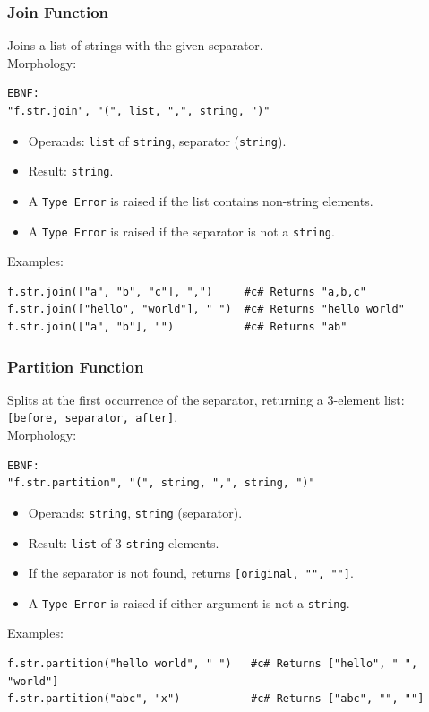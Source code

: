\subsubsection{Join Function}
Joins a list of strings with the given separator. \\
Morphology:
\begin{verbatim}
EBNF:
"f.str.join", "(", list, ",", string, ")"
\end{verbatim}
\begin{itemize}
\item Operands: \texttt{list} of \texttt{string}, separator (\texttt{string}).
\item Result: \texttt{string}.
\item A \texttt{Type Error} is raised if the list contains non-string elements.
\item A \texttt{Type Error} is raised if the separator is not a \texttt{string}.
\end{itemize}
Examples:
\begin{verbatim}
f.str.join(["a", "b", "c"], ",")     #c# Returns "a,b,c"
f.str.join(["hello", "world"], " ")  #c# Returns "hello world"
f.str.join(["a", "b"], "")           #c# Returns "ab"
\end{verbatim}

\subsubsection{Partition Function}
Splits at the first occurrence of the separator, returning a 3-element list: \texttt{[before, separator, after]}. \\
Morphology:
\begin{verbatim}
EBNF:
"f.str.partition", "(", string, ",", string, ")"
\end{verbatim}
\begin{itemize}
\item Operands: \texttt{string}, \texttt{string} (separator).
\item Result: \texttt{list} of 3 \texttt{string} elements.
\item If the separator is not found, returns \texttt{[original, "", ""]}.
\item A \texttt{Type Error} is raised if either argument is not a \texttt{string}.
\end{itemize}
Examples:
\begin{verbatim}
f.str.partition("hello world", " ")   #c# Returns ["hello", " ", "world"]
f.str.partition("abc", "x")           #c# Returns ["abc", "", ""]
\end{verbatim}

